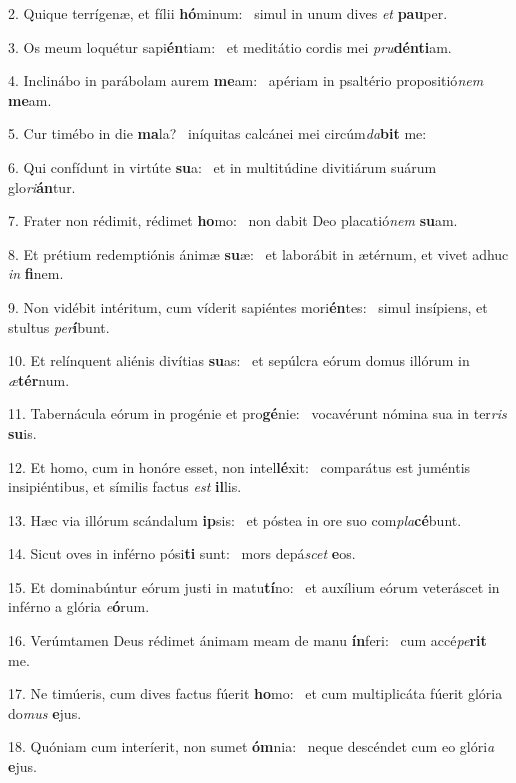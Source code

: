 2. Quique terrígenæ, et fílii \textbf{hó}minum: \ast\  simul in unum dives \textit{et} \textbf{pau}per.\

3. Os meum loquétur sapi\textbf{én}tiam: \ast\  et meditátio cordis mei \textit{pru}\textbf{dén}\textbf{ti}am.\

4. Inclinábo in parábolam aurem \textbf{me}am: \ast\  apériam in psaltério propositió\textit{nem} \textbf{me}am.\

5. Cur timébo in die \textbf{ma}la? \ast\  iníquitas calcánei mei circúm\textit{da}\textbf{bit} me:\

6. Qui confídunt in virtúte \textbf{su}a: \ast\  et in multitúdine divitiárum suárum glo\textit{ri}\textbf{án}tur.\

7. Frater non rédimit, rédimet \textbf{ho}mo: \ast\  non dabit Deo placatió\textit{nem} \textbf{su}am.\

8. Et prétium redemptiónis ánimæ \textbf{su}æ: \ast\  et laborábit in ætérnum, et vivet adhuc \textit{in} \textbf{fi}nem.\

9. Non vidébit intéritum, cum víderit sapiéntes mori\textbf{én}tes: \ast\  simul insípiens, et stultus \textit{per}\textbf{í}bunt.\

10. Et relínquent aliénis divítias \textbf{su}as: \ast\  et sepúlcra eórum domus illórum in \textit{æ}\textbf{tér}num.\

11. Tabernácula eórum in progénie et pro\textbf{gé}nie: \ast\  vocavérunt nómina sua in ter\textit{ris} \textbf{su}is.\

12. Et homo, cum in honóre esset, non intel\textbf{lé}xit: \ast\  comparátus est juméntis insipiéntibus, et símilis factus \textit{est} \textbf{il}lis.\

13. Hæc via illórum scándalum \textbf{ip}sis: \ast\  et póstea in ore suo com\textit{pla}\textbf{cé}bunt.\

14. Sicut oves in inférno pósi\textbf{ti} sunt: \ast\  mors depá\textit{scet} \textbf{e}os.\

15. Et dominabúntur eórum justi in matu\textbf{tí}no: \ast\  et auxílium eórum veteráscet in inférno a glória \textit{e}\textbf{ó}rum.\

16. Verúmtamen Deus rédimet ánimam meam de manu \textbf{ín}feri: \ast\  cum accé\textit{pe}\textbf{rit} me.\

17. Ne timúeris, cum dives factus fúerit \textbf{ho}mo: \ast\  et cum multiplicáta fúerit glória do\textit{mus} \textbf{e}jus.\

18. Quóniam cum interíerit, non sumet \textbf{óm}nia: \ast\  neque descéndet cum eo glóri\textit{a} \textbf{e}jus.\

